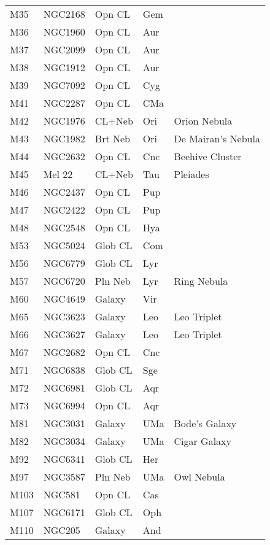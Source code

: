 \begin{longtable}{ p{0.7in}  p{1.0in}  p{0.6in}  p{0.9in}  p{5.1in} }
M35 & NGC2168 & Opn CL & Gem &  \\ 
M36 & NGC1960 & Opn CL & Aur &  \\ 
M37 & NGC2099 & Opn CL & Aur &  \\ 
M38 & NGC1912 & Opn CL & Aur &  \\ 
M39 & NGC7092 & Opn CL & Cyg &  \\ 
M41 & NGC2287 & Opn CL & CMa &  \\ 
M42 & NGC1976 & CL+Neb & Ori & Orion Nebula \\ 
M43 & NGC1982 & Brt Neb & Ori & De Mairan's Nebula \\ 
M44 & NGC2632 & Opn CL & Cnc & Beehive Cluster \\ 
M45 & Mel 22 & CL+Neb & Tau & Pleiades \\ 
M46 & NGC2437 & Opn CL & Pup &  \\ 
M47 & NGC2422 & Opn CL & Pup &  \\ 
M48 & NGC2548 & Opn CL & Hya &  \\ 
M53 & NGC5024 & Glob CL & Com &  \\ 
M56 & NGC6779 & Glob CL & Lyr &  \\ 
M57 & NGC6720 & Pln Neb & Lyr & Ring Nebula \\ 
M60 & NGC4649 & Galaxy & Vir &  \\ 
M65 & NGC3623 & Galaxy & Leo & Leo Triplet \\ 
M66 & NGC3627 & Galaxy & Leo & Leo Triplet \\ 
M67 & NGC2682 & Opn CL & Cnc &  \\ 
M71 & NGC6838 & Glob CL & Sge &  \\ 
M72 & NGC6981 & Glob CL & Aqr &  \\ 
M73 & NGC6994 & Opn CL & Aqr &  \\ 
M81 & NGC3031 & Galaxy & UMa & Bode's Galaxy \\ 
M82 & NGC3034 & Galaxy & UMa & Cigar Galaxy \\ 
M92 & NGC6341 & Glob CL & Her &  \\ 
M97 & NGC3587 & Pln Neb & UMa & Owl Nebula \\ 
M103 & NGC581 & Opn CL & Cas &  \\ 
M107 & NGC6171 & Glob CL & Oph &  \\ 
M110 & NGC205 & Galaxy & And &  \\ 
\hline 
\end{longtable} 
